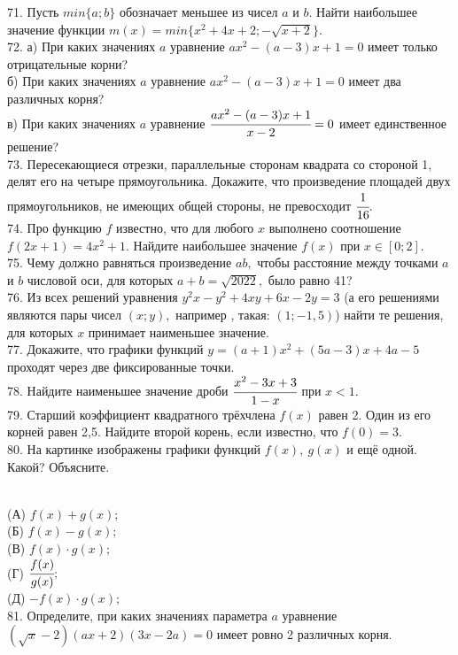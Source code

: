71. Пусть $min\{a;b\}$ обозначает меньшее из чисел $a$ и $b.$ Найти наибольшее значение функции $m(x)=min\{x^2+4x+2; -\sqrt{x+2}\}.$\\
72. а) При каких значениях $a$ уравнение $ax^2-(a-3)x+1=0$ имеет только отрицательные корни?\\
б) При каких значениях $a$ уравнение $ax^2-(a-3)x+1=0$ имеет два различных корня?\\
в) При каких значениях $a$ уравнение $\cfrac{ax^2-(a-3)x+1}{x-2}=0$ имеет единственное решение?\\
73. Пересекающиеся отрезки, параллельные сторонам квадрата со стороной 1, делят его на четыре прямоугольника. Докажите, что произведение площадей двух прямоугольников, не имеющих общей стороны, не превосходит $\cfrac{1}{16}.$\\
74. Про функцию $f$ известно, что для любого $x$ выполнено соотношение $f(2x+1)=4x^2+1.$ Найдите наибольшее значение $f(x)$ при $x\in[0;2].$\\
75. Чему должно равняться произведение $ab,$ чтобы расстояние между точками $a$ и $b$ числовой оси, для которых $a+b=\sqrt{2022},$ было равно 41?\\
76. Из всех решений уравнения $y^2x-y^2+4xy+6x-2y=3$ (а его решениями являются пары чисел $(x;y),$ например , такая: $(1;-1,5)$) найти те решения, для которых $x$ принимает наименьшее значение.\\
77. Докажите, что графики функций $y=(a+1)x^2+(5a-3)x+4a-5$ проходят через две фиксированные точки.\\
78. Найдите наименьшее значение дроби $\cfrac{x^2-3x+3}{1-x}$ при $x<1.$\\
79. Старший коэффициент квадратного трёхчлена $f(x)$ равен 2. Один из его корней равен 2,5. Найдите второй корень, если известно, что $f(0)=3.$\\
80. На картинке изображены графики функций $f(x),\ g(x)$ и ещё одной. Какой?
Объясните.\\
\begin{figure}[ht!]
\end{figure}\\
(А) $f(x)+g(x);$\\
(Б) $f(x)-g(x);$\\
(В) $f(x)\cdot g(x);$\\
(Г) $\cfrac{f(x)}{g(x)};$\\
(Д) $-f(x)\cdot g(x);$\\
81. Определите, при каких значениях параметра $a$ уравнение $(\sqrt{x}-2)(ax+2)(3x-2a)=0$ имеет ровно 2 различных корня.\\
